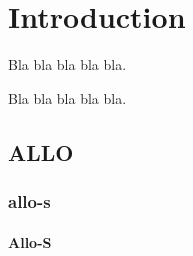 \chapter{Introduction}

Bla bla bla bla bla.

Bla bla bla bla bla.


\section{ALLO}

\subsection{allo-s}

\subsubsection{Allo-S} 
